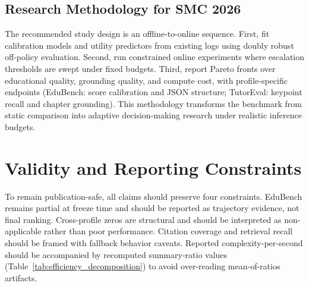 \subsection{Research Methodology for SMC 2026}
The recommended study design is an offline-to-online sequence. First, fit calibration models and utility predictors from existing logs using doubly robust off-policy evaluation. Second, run constrained online experiments where escalation thresholds are swept under fixed budgets. Third, report Pareto fronts over educational quality, grounding quality, and compute cost, with profile-specific endpoints (EduBench: score calibration and JSON structure; TutorEval: keypoint recall and chapter grounding). This methodology transforms the benchmark from static comparison into adaptive decision-making research under realistic inference budgets.

\section{Validity and Reporting Constraints}
To remain publication-safe, all claims should preserve four constraints. EduBench remains partial at freeze time and should be reported as trajectory evidence, not final ranking. Cross-profile zeros are structural and should be interpreted as non-applicable rather than poor performance. Citation coverage and retrieval recall should be framed with fallback behavior caveats. Reported complexity-per-second should be accompanied by recomputed summary-ratio values (Table~\ref{tab:efficiency_decomposition}) to avoid over-reading mean-of-ratios artifacts.
